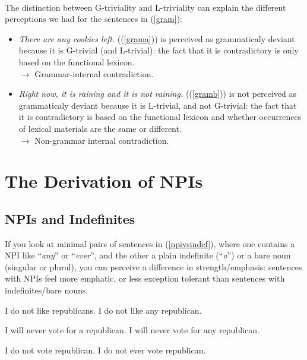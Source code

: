 \documentclass[a4paper,11pt]{article}
\newcommand{\reff}[1]{(\ref{#1})}
\newcommand{\exs}[2][]{\begin{exe}\ex #1 \begin{xlist}#2\end{xlist}\end{exe}}
\begin{document}
 \paragraph{}
 The distinction between G-triviality and L-triviality can explain the different perceptions we had for the sentences in \reff{gram}:
 \begin{itemize}
 \item \textit{There are any cookies left.} (\reff{grama}) is perceived as grammaticaly deviant because it is G-trivial (and L-trivial): the fact that it is contradictory is only based on the functional lexicon. 
 \\$\rightarrow$ Grammar-internal contradiction. 
 \item \textit{Right now, it is raining and it is not raining.} (\reff{gramb}) is not perceived as grammaticaly deviant because it is L-trivial, and not G-trivial: the fact that it is contradictory is based on the functional lexicon and whether occurrences of lexical materials are the same or different.  
 \\$\rightarrow$ Non-grammar internal contradiction. 
 \end{itemize}

\section{The Derivation of NPIs}

\subsection{NPIs and Indefinites}
If you look at minimal pairs of sentences in \reff{npivsindef}, where one contains a NPI like \enquote{\emph{any}} or \enquote{\emph{ever}}, and the other a plain indefinite (\enquote{\emph{a}}) or a bare noun (singular or plural), you can perceive a difference in strength/emphasis: sentences with NPIs feel more emphatic, or less exception tolerant than sentences with indefinites/bare nouns.

\exs[\label{npivsindef}]{
  \ex\label{npivsindefa}
    \begin{xlist}
      \ex I do not like republicans.
      \ex I do not like any republican.
    \end{xlist}
  \ex
    \begin{xlist}
      \ex I will never vote for a republican.
      \ex I will never vote for any republican.
    \end{xlist}
  \ex
    \begin{xlist}
      \ex I do not vote republican.
      \ex I do not ever vote republican.
    \end{xlist}
}
\end{document}
